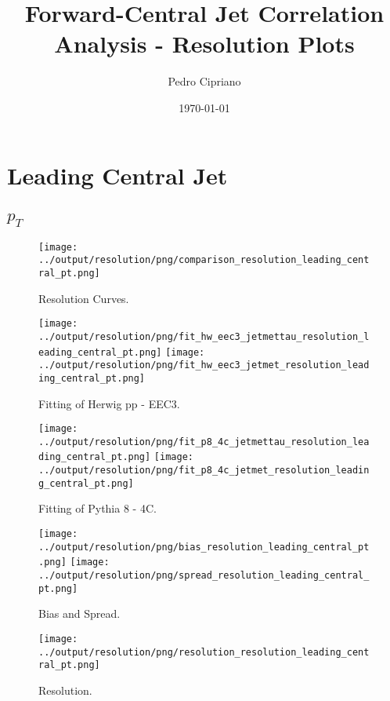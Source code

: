\documentclass[11pt]{book}
\begin{document}
         
 
 \author{Pedro Cipriano}
 \date{\today}
 \title{Forward-Central Jet Correlation Analysis - Resolution Plots}

\maketitle

\tableofcontents

\chapter{Leading Central Jet}
\section{$p_{T}$}

\begin{figure}[ht]
\centering
\texttt{[image: ../output/resolution/png/comparison\_resolution\_leading\_central\_pt.png]}
\caption{Resolution Curves.}
\end{figure}


\begin{figure}[ht]
\centering
\texttt{[image: ../output/resolution/png/fit\_hw\_eec3\_jetmettau\_resolution\_leading\_central\_pt.png]}
\texttt{[image: ../output/resolution/png/fit\_hw\_eec3\_jetmet\_resolution\_leading\_central\_pt.png]}
\caption{Fitting of Herwig pp - EEC3.}
\end{figure}

\begin{figure}[ht]
\centering
\texttt{[image: ../output/resolution/png/fit\_p8\_4c\_jetmettau\_resolution\_leading\_central\_pt.png]}
\texttt{[image: ../output/resolution/png/fit\_p8\_4c\_jetmet\_resolution\_leading\_central\_pt.png]}
\caption{Fitting of Pythia 8 - 4C.}
\end{figure}

\begin{figure}[ht]
\centering
\texttt{[image: ../output/resolution/png/bias\_resolution\_leading\_central\_pt.png]}
\texttt{[image: ../output/resolution/png/spread\_resolution\_leading\_central\_pt.png]}
\caption{Bias and Spread.}
\end{figure}


\begin{figure}[ht]
\centering
\texttt{[image: ../output/resolution/png/resolution\_resolution\_leading\_central\_pt.png]}
\caption{Resolution.}
\end{figure}
\clearpage
\end{document}
